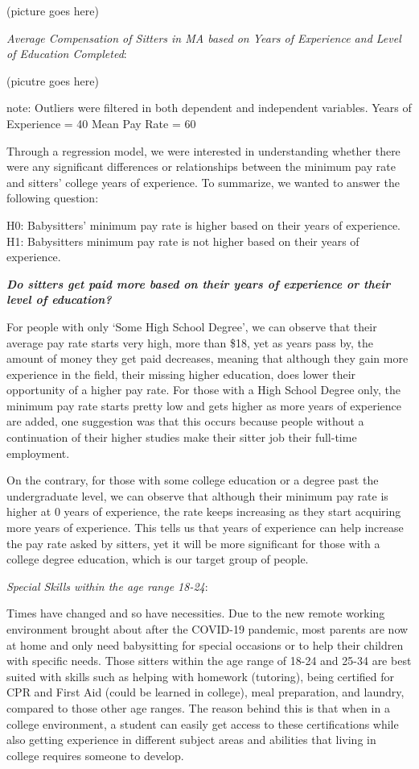 \documentclass[12pt]{article}
\begin{document}
(picture goes here)

\emph{Average Compensation of Sitters in MA based on Years of Experience
and Level of Education Completed}:

(picutre goes here)

note: Outliers were filtered in both dependent and independent
variables. Years of Experience = 40 Mean Pay Rate = 60

Through a regression model, we were interested in understanding whether
there were any significant differences or relationships between the
minimum pay rate and sitters' college years of experience. To summarize,
we wanted to answer the following question:

H0: Babysitters' minimum pay rate is higher based on their years of
experience. H1: Babysitters minimum pay rate is not higher based on
their years of experience.

\textbf{\emph{Do sitters get paid more based on their years of
experience or their level of education?}}

For people with only `Some High School Degree', we can observe that
their average pay rate starts very high, more than \$18, yet as years
pass by, the amount of money they get paid decreases, meaning that
although they gain more experience in the field, their missing higher
education, does lower their opportunity of a higher pay rate. For those
with a High School Degree only, the minimum pay rate starts pretty low
and gets higher as more years of experience are added, one suggestion
was that this occurs because people without a continuation of their
higher studies make their sitter job their full-time employment.

On the contrary, for those with some college education or a degree past
the undergraduate level, we can observe that although their minimum pay
rate is higher at 0 years of experience, the rate keeps increasing as
they start acquiring more years of experience. This tells us that years
of experience can help increase the pay rate asked by sitters, yet it
will be more significant for those with a college degree education,
which is our target group of people.

\emph{Special Skills within the age range 18-24}:

Times have changed and so have necessities. Due to the new remote
working environment brought about after the COVID-19 pandemic, most
parents are now at home and only need babysitting for special occasions
or to help their children with specific needs. Those sitters within the
age range of 18-24 and 25-34 are best suited with skills such as helping
with homework (tutoring), being certified for CPR and First Aid (could
be learned in college), meal preparation, and laundry, compared to those
other age ranges. The reason behind this is that when in a college
environment, a student can easily get access to these certifications
while also getting experience in different subject areas and abilities
that living in college requires someone to develop.
\end{document}
